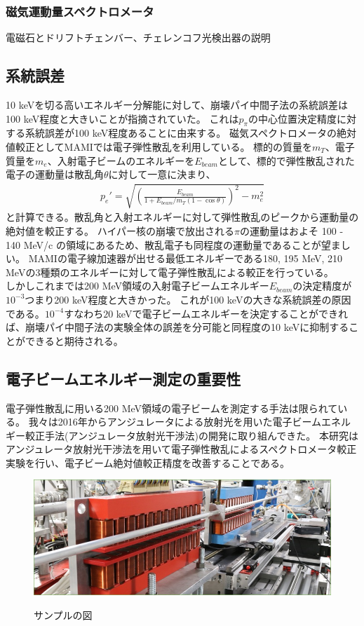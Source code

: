 \documentclass[a4paper,11pt,uplatex]{jsbook}
\begin{document}
\subsubsection{磁気運動量スペクトロメータ}
電磁石とドリフトチェンバー、チェレンコフ光検出器の説明

\subsection{系統誤差}
10 keVを切る高いエネルギー分解能に対して、崩壊パイ中間子法の系統誤差は100 keV程度と大きいことが指摘されていた。
これは$p_\pi$の中心位置決定精度に対する系統誤差が100 keV程度あることに由来する。
磁気スペクトロメータの絶対値較正としてMAMIでは電子弾性散乱を利用している。
標的の質量を$m_T$、電子質量を$m_e$、入射電子ビームのエネルギーを$E_{beam}$として、標的で弾性散乱された電子の運動量は散乱角$\theta$に対して一意に決まり、
\begin{eqnarray}
  p_e' = \sqrt{\left(\frac{E_{beam}}{1 + E_{beam}/m_T(1 - \cos{\theta})} \right)^2 - m_e^2}
\end{eqnarray}
と計算できる。散乱角と入射エネルギーに対して弾性散乱のピークから運動量の絶対値を較正する。
ハイパー核の崩壊で放出される$\pi$の運動量はおよそ 100 - 140 MeV/c の領域にあるため、散乱電子も同程度の運動量であることが望ましい。
MAMIの電子線加速器が出せる最低エネルギーである180, 195 MeV, 210 MeVの3種類のエネルギーに対して電子弾性散乱による較正を行っている。\\
しかしこれまでは200 MeV領域の入射電子ビームエネルギー$E_{beam}$の決定精度が$10^{-3}$つまり200 keV程度と大きかった。
これが100 keVの大きな系統誤差の原因である。$10^{-4}$すなわち$20$ keVで電子ビームエネルギーを決定することができれば、崩壊パイ中間子法の実験全体の誤差を分可能と同程度の10 keVに抑制することができると期待される。

\subsection{電子ビームエネルギー測定の重要性}
電子弾性散乱に用いる200 MeV領域の電子ビームを測定する手法は限られている。
我々は2016年からアンジュレータによる放射光を用いた電子ビームエネルギー較正手法(アンジュレータ放射光干渉法)の開発に取り組んできた。
本研究はアンジュレータ放射光干渉法を用いて電子弾性散乱によるスペクトロメータ較正実験を行い、電子ビーム絶対値較正精度を改善することである。

\clearpage

\begin{figure}[tb]
  \centering
  \includegraphics[width=0.8\linewidth]{image/1-1.jpg}\\
  \caption{サンプルの図}
  \label{sample_image}
\end{figure}
\end{document}
